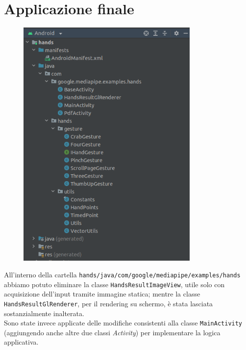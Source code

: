 \section{Applicazione finale}
\begin{figure}[H]
    \centering
    \includegraphics[width=0.8\textwidth]{images/struct_progetto.png}
\end{figure}
All'interno della cartella \texttt{hands/java/com/google/mediapipe/examples/hands} abbiamo potuto eliminare la classe \texttt{HandsResultImageView}, utile solo con acquisizione dell'input tramite immagine statica; mentre la classe \texttt{HandsResultGlRenderer}, per il rendering su schermo, è stata lasciata sostanzialmente inalterata.\\
Sono state invece applicate delle modifiche consistenti alla classe \texttt{MainActivity} (aggiungendo anche altre due classi \textit{Activity}) per implementare la logica applicativa.\\


